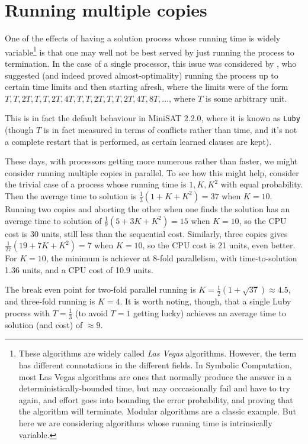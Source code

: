 \documentclass{easychair}
\begin{document}
\section{Running multiple copies}
One of the effects of having a solution process whose running time is widely variable\footnote{These algorithms are widely called \emph{Las Vegas} algorithms. However, the term has different connotations in the different fields. In Symbolic Computation, most Las Vegas algorithms are ones that normally produce the answer in a deterministically-bounded time, but may occcasionally fail and have to try again, and effort goes into bounding the error probability, and proving that the algorithm will terminate. Modular algorithms are a classic example. But here we are considering algorithms whose running time is intrinsically variable.} is that one may well not be best served by just running the process to termination.  In the case of a single processor, this issue was considered by \cite{Lubyetal1993}, who suggested (and indeed proved almost-optimality) running the process up to certain time limits and then starting afresh, where the limits were  of the form $T,T,2T,T,T,2T,4T,T,T,2T,T,T,2T,4T,8T,\ldots$, where $T$ is some arbitrary unit.
\par
This is in fact the default behaviour in MiniSAT 2.2.0, where it is known as \verb+Luby+ (though $T$ is in fact measured in terms of conflicts rather than time, and it's not a complete restart that is performed, as certain learned clauses are kept). 
\par
These days, with processors getting more numerous rather than faster, we might consider running multiple copies in parallel. To see how this might help, consider the trivial case of a process whose running time is $1,K,K^2$ with equal probability. Then the average time to solution is $\frac13(1+K+K^2)=37$ when $K=10$. Running two copies and aborting the other when one finds the solution has an average time to solution of $\frac19(5+3K+K^2)=15$ when $K=10$, so the CPU cost is 30 units, still less than the sequential cost.
Similarly, three copies gives $\frac1{27}(19+7K+K^2)=7$ when $K=10$, so the CPU cost is 21 units, even better.  For $K=10$, the minimum is achiever at 8-fold parallelism, with time-to-solution 1.36 units, and a CPU cost of 10.9 units.

The break even point for two-fold parallel running is $K=\frac12\left(1+\sqrt{37}\right)\approx4.5$, and three-fold running is $K=4$. It is worth noting, though, that a single Luby process with $T=\frac13$ (to avoid $T=1$ getting lucky) achieves an average time to solution (and cost) of $\approx 9$.
\end{document}
